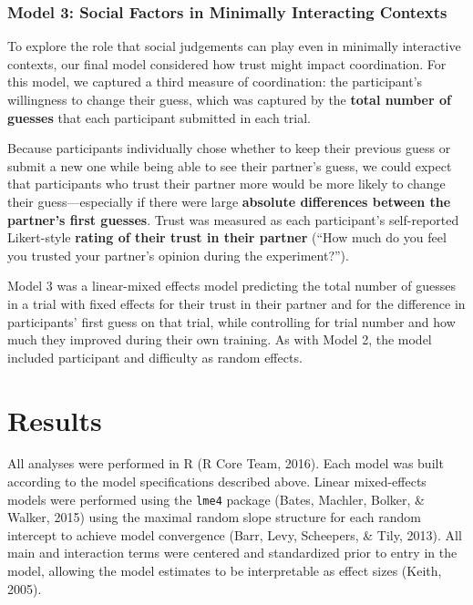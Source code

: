 \documentclass[10pt, letterpaper]{article}
\begin{document}
\subsubsection{Model 3: Social Factors in Minimally Interacting
Contexts}\label{model-3-social-factors-in-minimally-interacting-contexts}

To explore the role that social judgements can play even in minimally
interactive contexts, our final model considered how trust might impact
coordination. For this model, we captured a third measure of
coordination: the participant's willingness to change their guess, which
was captured by the \textbf{total number of guesses} that each
participant submitted in each trial.

Because participants individually chose whether to keep their previous
guess or submit a new one while being able to see their partner's guess,
we could expect that participants who trust their partner more would be
more likely to change their guess---especially if there were large
\textbf{absolute differences between the partner's first guesses}. Trust
was measured as each participant's self-reported Likert-style
\textbf{rating of their trust in their partner} (``How much do you feel
you trusted your partner's opinion during the experiment?'').

Model 3 was a linear-mixed effects model predicting the total number of
guesses in a trial with fixed effects for their trust in their partner
and for the difference in participants' first guess on that trial, while
controlling for trial number and how much they improved during their own
training. As with Model 2, the model included participant and difficulty
as random effects.

\section{Results}\label{results}

All analyses were performed in R (R Core Team, 2016). Each model was
built according to the model specifications described above. Linear
mixed-effects models were performed using the \texttt{lme4} package
(Bates, Machler, Bolker, \& Walker, 2015) using the maximal random slope
structure for each random intercept to achieve model convergence (Barr,
Levy, Scheepers, \& Tily, 2013). All main and interaction terms were
centered and standardized prior to entry in the model, allowing the
model estimates to be interpretable as effect sizes (Keith, 2005).
\end{document}

